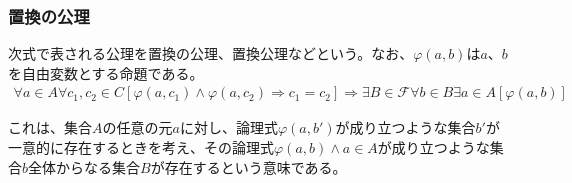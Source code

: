 \documentclass[a4paper]{jsarticle}
\begin{document}
\subsubsection{置換の公理}%
\begin{axs}
次式で表される公理を置換の公理、置換公理などという。なお、$\varphi(a,b)$は$a$、$b$を自由変数とする命題である。
\begin{align*}
\forall a \in A\forall c_{1},c_{2} \in C\left[ \varphi\left( a,c_{1} \right) \land \varphi\left( a,c_{2} \right) \Rightarrow c_{1} = c_{2} \right] \Rightarrow \exists B\in \mathcal{F} \forall b \in B\exists a \in A\left[ \varphi(a,b) \right]
\end{align*}
\end{axs}
これは、集合$A$の任意の元$a$に対し、論理式$\varphi\left( a,b' \right)$が成り立つような集合$b'$が一意的に存在するときを考え、その論理式$\varphi(a,b) \land a \in A$が成り立つような集合$b$全体からなる集合$B$が存在するという意味である。
\end{document}
